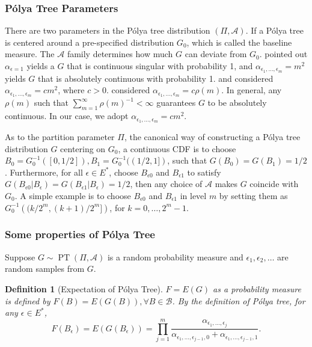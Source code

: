 \documentclass[12pt]{article}
\newtheorem{deff}[thm]{Definition}
\newcommand{\polya}{P\'{o}lya}
\DeclareMathOperator{\pt}{PT}
\begin{document}
\subsubsection{\polya{} Tree Parameters}
There are two parameters in the \polya{} tree distribution $(\Pi,
\mathcal{A})$. If a \polya{} tree is centered around a
  pre-specified distribution $G_0$, which is called the baseline
  measure. The $\mathcal{A}$ family determines how much $G$ can
deviate from $G_0$. \citet{ferguson1974} pointed out $\alpha_{\epsilon = 1}
$ yields a $G$ that is continuous singular with probability 1, and
$\alpha_{\epsilon_1, \ldots, \epsilon_m} = m^2$ yields $G$ that is
absolutely continuous with probability 1. \citet{walker1999} and
\citet{paddock1999} considered $\alpha_{\epsilon_1, \ldots,
  \epsilon_m} = cm^2$, where $c > 0$. \citet{berger2001} considered
$\alpha_{\epsilon_1, \ldots, \epsilon_m} = c \rho(m)$. In general, any
$\rho(m) $ such that $\sum_{m=1}^{\infty} \rho(m)^{-1} < \infty$
guarantees $G$ to be absolutely continuous. In our case, we adopt
$\alpha_{\epsilon_1, \ldots, \epsilon_m} = cm^2$.

As to the partition parameter $\Pi$, the canonical way of constructing
a \polya{} tree distribution $G$ centering on $G_0$, a continuous CDF
is to choose $B_0 = G^{-1}_0 ([0, 1/2]), B_1 = G^{-1}_0 ((1/2,1])$,
such that $G(B_0) = G(B_1)= 1/2$. Furthermore, for all $\epsilon \in
E^{*}$, choose $B_{\epsilon 0 }$ and $B_{\epsilon 1}$ to satisfy
$G(B_{\epsilon 0 } |B_{\epsilon} ) = G(B_{\epsilon 1} | B_{\epsilon})
= 1/2 $, then any choice of $\mathcal{A} $ makes $G$ coincide with
$G_0$. A simple example is to choose $B_{\epsilon 0} $ and
$B_{\epsilon 1}$ in level $m$ by setting them as $G^{-1}_0 \left(
  (k/2^m, (k+1)/2^m] \right)$, for $k=0, \ldots, 2^m-1$.

\subsubsection{Some properties of \polya{} Tree}
Suppose $G \sim \pt (\Pi, \mathcal{A})$ is a random probability
measure and $\epsilon_1, \epsilon_2, \ldots$ are random samples from
$G$.

\begin{deff}[Expectation of \polya{} Tree]
  $F= E(G)$ as a probability measure is defined by $F(B) = E(G(B)),
  \forall B \in \mathcal{B}$. By the definition of \polya{} tree, for
  any $\epsilon \in E^{*}$,
  \begin{displaymath}
    F(B_{\epsilon})  = E(G(B_{\epsilon})) = \prod_{j=1}^m
    \frac{\alpha_{\epsilon_1, \ldots, \epsilon_j}}{\alpha_{\epsilon_1,
        \ldots, \epsilon_{j-1},0} + \alpha_{\epsilon_1, \ldots, \epsilon_{j-1},1}}.
  \end{displaymath}
\end{deff}
\end{document}
